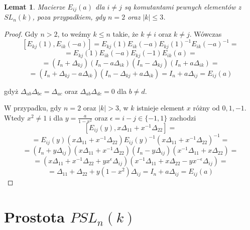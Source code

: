 \documentclass[licencjacka]{pracamgr}
\newtheorem{lemma}{Lemat}[section]
\begin{document}
\begin{lemma}\label{lemma_Eij_are_commutants}
  Macierze $E_{i j}(a)$ dla $i \ne j$ są komutantami pewnych elementów z $SL_n(k)$, poza przypadkiem, gdy $n = 2$ oraz $|k| \le 3$.
\end{lemma}
\begin{proof}
  Gdy $n > 2$, to weźmy $k \le n$ takie, że $k \ne i$ oraz $k \ne j$. Wówczas
  $$ [ E_{k j}(1), E_{i k}(-a) ] = E_{k j}(1) E_{i k}(-a) E_{k j}(1)^{-1} E_{i k}(-a) ^{-1} = $$
  $$ = E_{k j}(1) E_{i k}(-a) E_{k j}(-1) E_{i k}(a) = $$
  $$ = (I_n + \Delta_{k j})(I_n -a \Delta_{i k})(I_n - \Delta_{k j}) (I_n + a \Delta_{i k}) = $$
  $$ = (I_n + \Delta_{k j} - a \Delta_{i k}) (I_n - \Delta_{k j} + a \Delta_{i k}) = I_n + a \Delta_{i j} = E_{i j}(a)$$

  gdyż $\Delta_{a b} \Delta_{b c} = \Delta_{a c}$ oraz $\Delta_{a b} \Delta_{d c} = 0$ dla $b \ne d$.

  W przypadku, gdy $n = 2$ oraz $|k| > 3$, w $k$ istnieje element $x$ różny od $0, 1, -1$.
  Wtedy $x^2 \ne 1$ i dla $y = \frac{a}{1 - x^2}$ oraz $\epsilon = i - j \in \{-1, 1\}$ zachodzi
  $$ [ E_{i j}(y), x \Delta_{1 1} + x^{-1} \Delta_{2 2}] = $$
  $$ = E_{i j}(y)(x \Delta_{1 1} + x^{-1} \Delta_{2 2}) E_{i j}(y)^{-1} (x \Delta_{1 1} + x^{-1} \Delta_{2 2})^{-1} = $$
  $$ = (I_n + y \Delta_{i j})(x \Delta_{1 1} + x^{-1} \Delta_{2 2}) (I_n -y \Delta_{i j}) (x^{-1} \Delta_{1 1} + x \Delta_{2 2}) = $$
  $$ = (x \Delta_{1 1} + x^{-1} \Delta_{2 2} + y x^\epsilon \Delta_{i j}) (x^{-1} \Delta_{1 1} + x \Delta_{2 2} - y x^{-\epsilon} \Delta_{i j}) = $$
  $$ = \Delta_{1 1} + \Delta_{2 2} + y (1-x^2) \Delta_{i j}= I_n + a \Delta_{i j} = E_{i j}(a) $$
\end{proof}


\section{Prostota $PSL_n(k)$}
\end{document}
